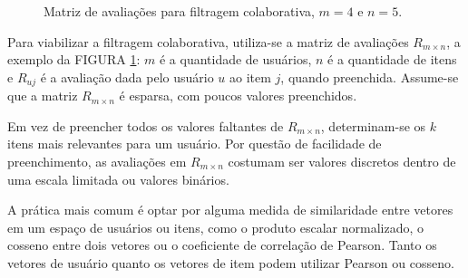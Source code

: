 \begin{figure}[h!]
    \centering
    \caption{Matriz de avaliações para filtragem colaborativa, $m=4$ e $n=5$.}
    \label{fig:ratings_matrix}
\end{figure}

Para viabilizar a filtragem colaborativa, utiliza-se a matriz de avaliações
$R_{m \times n}$, a exemplo da FIGURA \ref{fig:ratings_matrix}: $m$ é a quantidade de usuários, $n$ é a quantidade de
itens e $R_{uj}$ é a avaliação dada pelo usuário $u$ ao item $j$, quando
preenchida. Assume-se que a matriz $R_{m \times n}$ é esparsa, com poucos
valores preenchidos.

Em vez de preencher todos os valores faltantes de $R_{m \times n}$,
determinam-se os $k$ itens mais relevantes para um usuário. Por questão de
facilidade de preenchimento, as avaliações em $R_{m \times n}$ costumam ser
valores discretos dentro de uma escala limitada ou valores binários.

A prática mais comum é optar por alguma medida de similaridade entre vetores em
um espaço de usuários ou itens, como o produto escalar normalizado, o cosseno
entre dois vetores ou o coeficiente de correlação de Pearson. Tanto os vetores
de usuário quanto os vetores de item podem utilizar Pearson ou cosseno.

